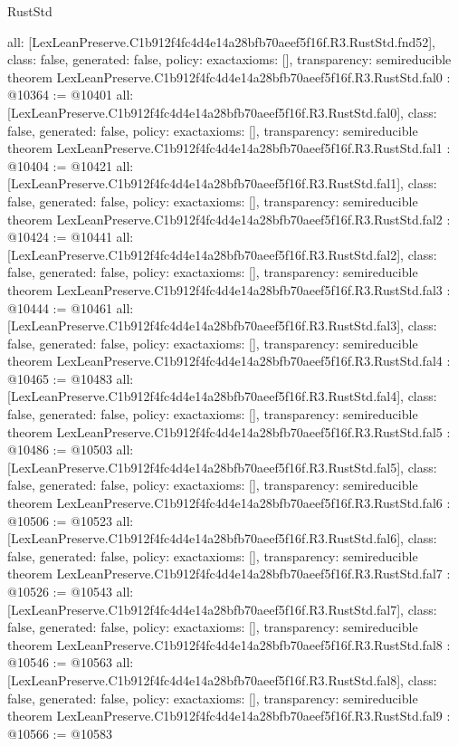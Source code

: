 \begin{lexlean}{RustStd}
\begin{coremodule}
{  all: [LexLeanPreserve.C1b912f4fc4d4e14a28bfb70aeef5f16f.R3.RustStd.fnd52],
  class: false,
  generated: false,
  policy: exact{axioms: []},
  transparency: semireducible
}
theorem LexLeanPreserve.C1b912f4fc4d4e14a28bfb70aeef5f16f.R3.RustStd.fal0 : @10364 := @10401 {
  all: [LexLeanPreserve.C1b912f4fc4d4e14a28bfb70aeef5f16f.R3.RustStd.fal0],
  class: false,
  generated: false,
  policy: exact{axioms: []},
  transparency: semireducible
}
theorem LexLeanPreserve.C1b912f4fc4d4e14a28bfb70aeef5f16f.R3.RustStd.fal1 : @10404 := @10421 {
  all: [LexLeanPreserve.C1b912f4fc4d4e14a28bfb70aeef5f16f.R3.RustStd.fal1],
  class: false,
  generated: false,
  policy: exact{axioms: []},
  transparency: semireducible
}
theorem LexLeanPreserve.C1b912f4fc4d4e14a28bfb70aeef5f16f.R3.RustStd.fal2 : @10424 := @10441 {
  all: [LexLeanPreserve.C1b912f4fc4d4e14a28bfb70aeef5f16f.R3.RustStd.fal2],
  class: false,
  generated: false,
  policy: exact{axioms: []},
  transparency: semireducible
}
theorem LexLeanPreserve.C1b912f4fc4d4e14a28bfb70aeef5f16f.R3.RustStd.fal3 : @10444 := @10461 {
  all: [LexLeanPreserve.C1b912f4fc4d4e14a28bfb70aeef5f16f.R3.RustStd.fal3],
  class: false,
  generated: false,
  policy: exact{axioms: []},
  transparency: semireducible
}
theorem LexLeanPreserve.C1b912f4fc4d4e14a28bfb70aeef5f16f.R3.RustStd.fal4 : @10465 := @10483 {
  all: [LexLeanPreserve.C1b912f4fc4d4e14a28bfb70aeef5f16f.R3.RustStd.fal4],
  class: false,
  generated: false,
  policy: exact{axioms: []},
  transparency: semireducible
}
theorem LexLeanPreserve.C1b912f4fc4d4e14a28bfb70aeef5f16f.R3.RustStd.fal5 : @10486 := @10503 {
  all: [LexLeanPreserve.C1b912f4fc4d4e14a28bfb70aeef5f16f.R3.RustStd.fal5],
  class: false,
  generated: false,
  policy: exact{axioms: []},
  transparency: semireducible
}
theorem LexLeanPreserve.C1b912f4fc4d4e14a28bfb70aeef5f16f.R3.RustStd.fal6 : @10506 := @10523 {
  all: [LexLeanPreserve.C1b912f4fc4d4e14a28bfb70aeef5f16f.R3.RustStd.fal6],
  class: false,
  generated: false,
  policy: exact{axioms: []},
  transparency: semireducible
}
theorem LexLeanPreserve.C1b912f4fc4d4e14a28bfb70aeef5f16f.R3.RustStd.fal7 : @10526 := @10543 {
  all: [LexLeanPreserve.C1b912f4fc4d4e14a28bfb70aeef5f16f.R3.RustStd.fal7],
  class: false,
  generated: false,
  policy: exact{axioms: []},
  transparency: semireducible
}
theorem LexLeanPreserve.C1b912f4fc4d4e14a28bfb70aeef5f16f.R3.RustStd.fal8 : @10546 := @10563 {
  all: [LexLeanPreserve.C1b912f4fc4d4e14a28bfb70aeef5f16f.R3.RustStd.fal8],
  class: false,
  generated: false,
  policy: exact{axioms: []},
  transparency: semireducible
}
theorem LexLeanPreserve.C1b912f4fc4d4e14a28bfb70aeef5f16f.R3.RustStd.fal9 : @10566 := @10583 {
}
\end{coremodule}
\end{lexlean}
